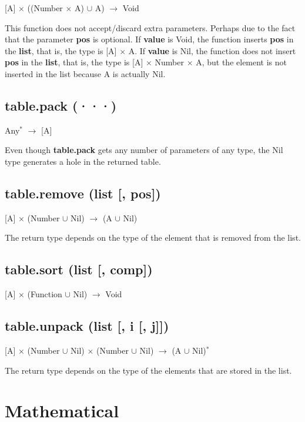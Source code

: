 \documentclass[12pt]{article}
\begin{document}
[A] $\times$ ((Number $\times$ A) $\cup$ A) $\rightarrow$ Void

This function does not accept/discard extra parameters.
Perhaps due to the fact that the parameter \textbf{pos} is optional.
If \textbf{value} is Void, the function inserts \textbf{pos} in the
\textbf{list}, that is, the type is [A] $\times$ A.
If \textbf{value} is Nil, the function does not insert \textbf{pos}
in the \textbf{list}, that is, the type is
[A] $\times$ Number $\times$ A, but the element is not inserted in
the list because A is actually Nil.

\subsection{table.pack (···)}

Any$^*$ $\rightarrow$ [A]

Even though \textbf{table.pack} gets any number of parameters of
any type, the Nil type generates a hole in the returned table.

\subsection{table.remove (list [, pos])}

[A] $\times$ (Number $\cup$ Nil) $\rightarrow$ (A $\cup$ Nil)

The return type depends on the type of the element that is removed
from the list.

\subsection{table.sort (list [, comp])}

[A] $\times$ (Function $\cup$ Nil) $\rightarrow$ Void

\subsection{table.unpack (list [, i [, j]])}

[A] $\times$
(Number $\cup$ Nil) $\times$
(Number $\cup$ Nil) $\rightarrow$
(A $\cup$ Nil)$^*$

The return type depends on the type of the elements that are stored in
the list.

\newpage

\section{Mathematical}
\end{document}
